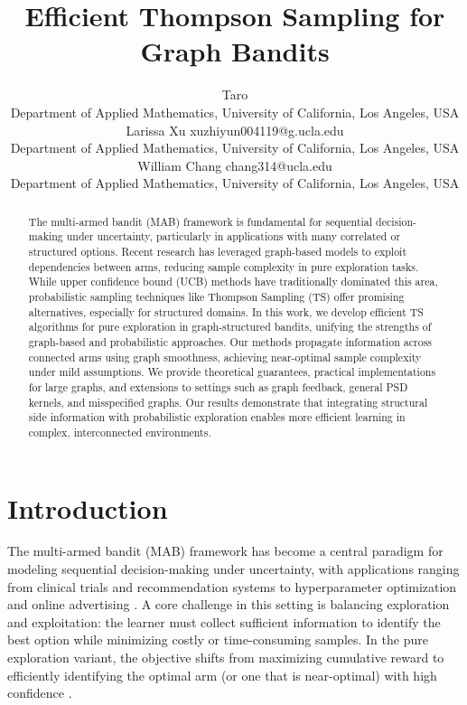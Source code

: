 \documentclass{article}
\title{Efficient Thompson Sampling for Graph Bandits}
\author{\name Taro \email  \\
      \addr Department of Applied Mathematics, University of California, Los Angeles, USA
      \AND
      \name Larissa Xu \email xuzhiyun004119@g.ucla.edu \\
      \addr Department of Applied Mathematics, University of California, Los Angeles, USA
      \AND
      \name William Chang \email chang314@ucla.edu \\
      \addr Department of Applied Mathematics, University of California, Los Angeles, USA}
\begin{document}
\maketitle


\begin{abstract}
The multi-armed bandit (MAB) framework is fundamental for sequential decision-making under uncertainty, particularly in applications with many correlated or structured options. Recent research has leveraged graph-based models to exploit dependencies between arms, reducing sample complexity in pure exploration tasks. While upper confidence bound (UCB) methods have traditionally dominated this area, probabilistic sampling techniques like Thompson Sampling (TS) offer promising alternatives, especially for structured domains. In this work, we develop efficient TS algorithms for pure exploration in graph-structured bandits, unifying the strengths of graph-based and probabilistic approaches. Our methods propagate information across connected arms using graph smoothness, achieving near-optimal sample complexity under mild assumptions. We provide theoretical guarantees, practical implementations for large graphs, and extensions to settings such as graph feedback, general PSD kernels, and misspecified graphs. Our results demonstrate that integrating structural side information with probabilistic exploration enables more efficient learning in complex, interconnected environments.
\end{abstract}


\section{Introduction}\label{sec:introduction}

The multi-armed bandit (MAB) framework has become a central paradigm for modeling sequential decision-making under uncertainty, with applications ranging from clinical trials and recommendation systems to hyperparameter optimization and online advertising \citep{lattimore2020bandit}. A core challenge in this setting is balancing exploration and exploitation: the learner must collect sufficient information to identify the best option while minimizing costly or time-consuming samples. In the pure exploration variant, the objective shifts from maximizing cumulative reward to efficiently identifying the optimal arm (or one that is near-optimal) with high confidence \citep{audibert2010best, kaufmann2016complexity}.
\end{document}
